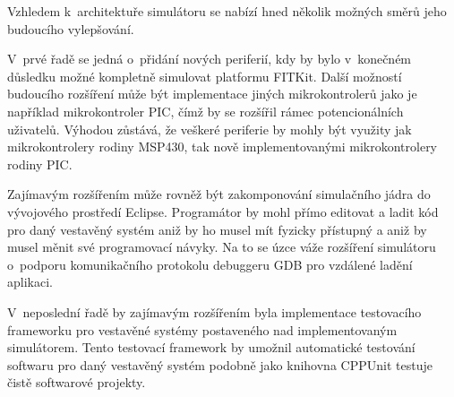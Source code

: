 Vzhledem k~architektuře simulátoru se nabízí hned několik možných směrů jeho budoucího vylepšování.

V~prvé řadě se jedná o~přidání nových periferií, kdy by bylo v~konečném důsledku možné kompletně simulovat platformu FITKit. Další možností budoucího rozšíření může být implementace jiných mikrokontrolerů jako je například mikrokontroler PIC, čímž by se rozšířil rámec potencionálních uživatelů. Výhodou zůstává, že veškeré periferie by mohly být využity jak mikrokontrolery rodiny MSP430, tak nově implementovanými mikrokontrolery rodiny PIC.

Zajímavým rozšířením může rovněž být zakomponování simulačního jádra do vývojového prostředí Eclipse. Programátor by mohl přímo editovat a ladit kód pro daný vestavěný systém aniž by ho musel mít fyzicky přístupný a aniž by musel měnit své programovací návyky. Na to se úzce váže rozšíření simulátoru o~podporu komunikačního protokolu debuggeru GDB pro vzdálené ladění aplikaci.

V~neposlední řadě by zajímavým rozšířením byla implementace testovacího frameworku pro vestavěné systémy postaveného nad implementovaným simulátorem. Tento testovací framework by umožnil automatické testování softwaru pro daný vestavěný systém podobně jako knihovna CPPUnit testuje čistě softwarové projekty.



